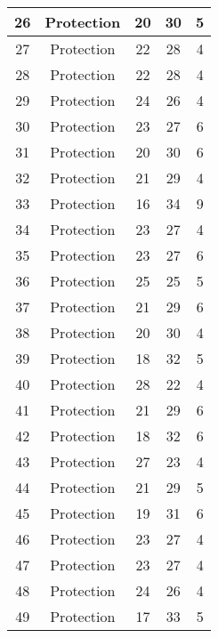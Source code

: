 \documentclass[results.tex]{subfiles}
\begin{document}
\begin{center}
\begin{tabular}{| c || c | c | c | c |}
    \hline
    26 & Protection & 20 & 30 & 5 \\ 
    \hline
    27 & Protection & 22 & 28 & 4 \\ 
    \hline
    28 & Protection & 22 & 28 & 4 \\ 
    \hline
    29 & Protection & 24 & 26 & 4 \\ 
    \hline
    30 & Protection & 23 & 27 & 6 \\ 
    \hline
    31 & Protection & 20 & 30 & 6 \\ 
    \hline
    32 & Protection & 21 & 29 & 4 \\ 
    \hline
    33 & Protection & 16 & 34 & 9 \\ 
    \hline
    34 & Protection & 23 & 27 & 4 \\ 
    \hline
    35 & Protection & 23 & 27 & 6 \\ 
    \hline
    36 & Protection & 25 & 25 & 5 \\ 
    \hline
    37 & Protection & 21 & 29 & 6 \\ 
    \hline
    38 & Protection & 20 & 30 & 4 \\ 
    \hline
    39 & Protection & 18 & 32 & 5 \\ 
    \hline
    40 & Protection & 28 & 22 & 4 \\ 
    \hline
    41 & Protection & 21 & 29 & 6 \\ 
    \hline
    42 & Protection & 18 & 32 & 6 \\ 
    \hline
    43 & Protection & 27 & 23 & 4 \\ 
    \hline
    44 & Protection & 21 & 29 & 5 \\ 
    \hline
    45 & Protection & 19 & 31 & 6 \\ 
    \hline
    46 & Protection & 23 & 27 & 4 \\ 
    \hline
    47 & Protection & 23 & 27 & 4 \\ 
    \hline
    48 & Protection & 24 & 26 & 4 \\ 
    \hline
    49 & Protection & 17 & 33 & 5 \\ 
    \hline   \end{tabular}
\end{center}
\end{document}
